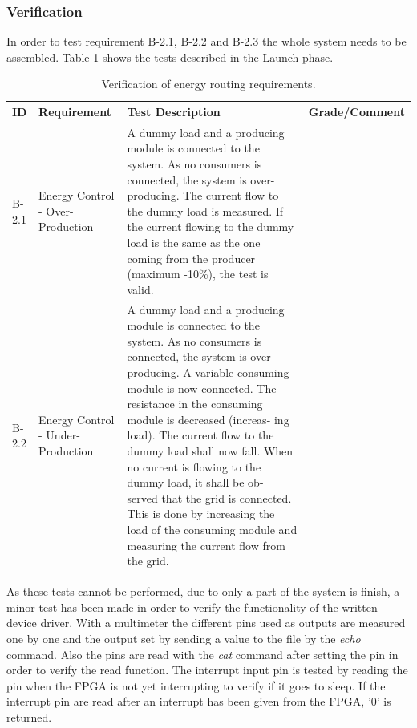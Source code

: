 %
%
\subsubsection{Verification}
In order to test requirement B-2.1, B-2.2 and B-2.3 the whole system needs to be assembled. Table \ref{tab:gpio_req_test} shows the tests described in the Launch phase. 
\begin{table}[H]
\centering
	\begin{tabular}{|p{1.0cm}|p{3.0cm}|p{9.0cm}|p{2.5cm}|}
	\hline
	ID		& Requirement		& Test Description		& Grade/Comment\\\hline
	B-2.1	& Energy Control - Over-Production & A dummy load and a producing module is connected to the system. As no consumers is connected, the system is over- producing. The current flow to the dummy load is measured. If the current flowing to the dummy load is the same as the one coming from the producer (maximum -10\%), the test is valid. &~\\\hline
	B-2.2	& Energy Control - Under-Production & A dummy load and a producing module is connected to the system. As no consumers is connected, the system is over- producing. A variable consuming module is now connected. The resistance in the consuming module is decreased (increas- ing load). The current flow to the dummy load shall now fall. When no current is flowing to the dummy load, it shall be ob- served that the grid is connected. This is done by increasing the load of the consuming module and measuring the current flow from the grid. &~\\\hline
	\end{tabular}
	\caption{Verification of energy routing requirements.}
	\label{tab:gpio_req_test}
\end{table}
As these tests cannot be performed, due to only a part of the system is finish, a minor test has been made in order to verify the functionality of the written device driver.
\p With a multimeter the different pins used as outputs are measured one by one and the output set by sending a value to the file by the \textit{echo} command. Also the pins are read with the \textit{cat} command after setting the pin in order to verify the read function.
\p The interrupt input pin is tested by reading the pin when the FPGA is not yet interrupting to verify if it goes to sleep. If the interrupt pin are read after an interrupt has been given from the FPGA, '0' is returned. 

